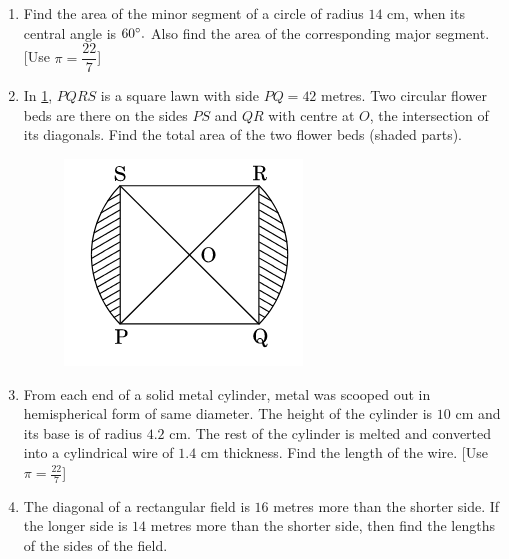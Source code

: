 \begin{enumerate}
\item Find the area of the minor segment of a circle of radius $14$ cm, when its central angle is $60 \degree.$ Also find the area of the corresponding major segment. [Use $\pi =\dfrac{22}{7}$]
\item In \ref{Figure 5}, $PQRS$ is a square lawn with side $PQ = 42$ metres. Two circular flower beds are there on the sides $PS$ and $QR$ with centre at $O$, the intersection of its diagonals. Find the total area of the two flower beds (shaded parts).
 \begin{figure}[h!]
	\centering
    \includegraphics[width=\columnwidth]{figs/cbse_30_3_5.png}
	\label{Figure 5}
\end{figure}
\item From each end of a solid metal cylinder, metal was scooped out in hemispherical form of same diameter. The height of the cylinder is $10$ cm and its base is of radius $4.2$ cm. The rest of the cylinder is melted and converted into a cylindrical wire of $1.4$ cm thickness. Find the length of the wire. [Use $ \pi=\frac{22}{7} $]
\item The diagonal of a rectangular field is $16$ metres more than the shorter side. If the longer side is $14$ metres more than the shorter side, then find the lengths of the sides of the field.


\end{enumerate}

